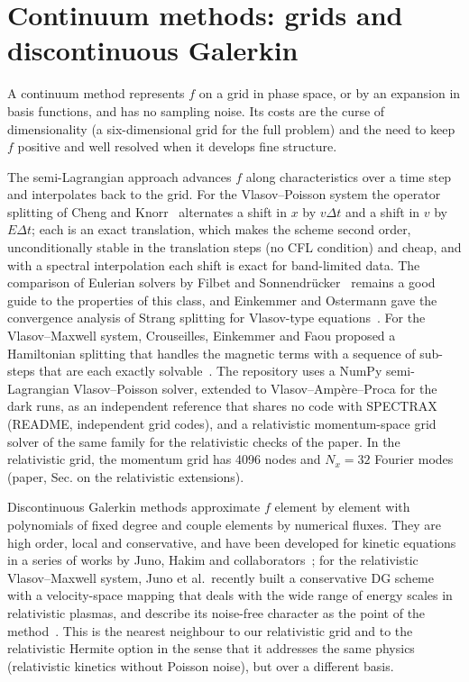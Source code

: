 \section{Continuum methods: grids and discontinuous Galerkin}\label{sec:grid}

A continuum method represents $f$ on a grid in phase space, or by an expansion in basis functions, and has no sampling noise. Its costs are the curse of dimensionality (a six-dimensional grid for the full problem) and the need to keep $f$ positive and well resolved when it develops fine structure.

The semi-Lagrangian approach advances $f$ along characteristics over a time step and interpolates back to the grid. For the Vlasov--Poisson system the operator splitting of Cheng and Knorr~\citep{ChengKnorr1976} alternates a shift in $x$ by $v\Delta t$ and a shift in $v$ by $E\Delta t$; each is an exact translation, which makes the scheme second order, unconditionally stable in the translation steps (no CFL condition) and cheap, and with a spectral interpolation each shift is exact for band-limited data. The comparison of Eulerian solvers by Filbet and Sonnendr\"ucker~\citep{FilbetSonnendrucker2003} remains a good guide to the properties of this class, and Einkemmer and Ostermann gave the convergence analysis of Strang splitting for Vlasov-type equations~\citep{Einkemmer2014}. For the Vlasov--Maxwell system, Crouseilles, Einkemmer and Faou proposed a Hamiltonian splitting that handles the magnetic terms with a sequence of sub-steps that are each exactly solvable~\citep{Crouseilles2015}. The repository uses a NumPy semi-Lagrangian Vlasov--Poisson solver, extended to Vlasov--Amp\`ere--Proca for the dark runs, as an independent reference that shares no code with SPECTRAX (README, independent grid codes), and a relativistic momentum-space grid solver of the same family for the relativistic checks of the paper. In the relativistic grid, the momentum grid has 4096 nodes and $N_x=32$ Fourier modes (paper, Sec. on the relativistic extensions).

Discontinuous Galerkin methods approximate $f$ element by element with polynomials of fixed degree and couple elements by numerical fluxes. They are high order, local and conservative, and have been developed for kinetic equations in a series of works by Juno, Hakim and collaborators~\citep{Juno2018}; for the relativistic Vlasov--Maxwell system, Juno et al.\ recently built a conservative DG scheme with a velocity-space mapping that deals with the wide range of energy scales in relativistic plasmas, and describe its noise-free character as the point of the method~\citep{Juno2026}. This is the nearest neighbour to our relativistic grid and to the relativistic Hermite option in the sense that it addresses the same physics (relativistic kinetics without Poisson noise), but over a different basis.

